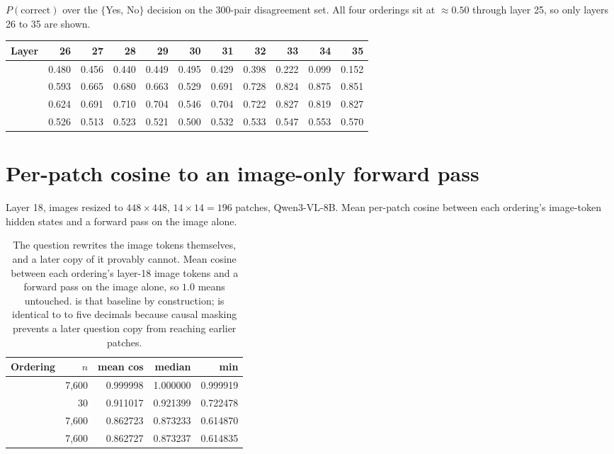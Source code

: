 $P(\text{correct})$ over the $\{$Yes, No$\}$ decision on the $300$-pair
disagreement set. All four orderings sit at $\approx 0.50$ through layer 25, so
only layers 26 to 35 are shown.

\begin{center}
\footnotesize
\setlength{\tabcolsep}{3.5pt}
\begin{tabular}{lrrrrrrrrrr}
\toprule
Layer & 26 & 27 & 28 & 29 & 30 & 31 & 32 & 33 & 34 & 35 \\
\midrule
\sti{}   & 0.480 & 0.456 & 0.440 & 0.449 & 0.495 & 0.429 & 0.398 & 0.222 & 0.099 & 0.152 \\
\sit{}   & 0.593 & 0.665 & 0.680 & 0.663 & 0.529 & 0.691 & 0.728 & 0.824 & 0.875 & 0.851 \\
\sitit{} & 0.624 & 0.691 & 0.710 & 0.704 & 0.546 & 0.704 & 0.722 & 0.827 & 0.819 & 0.827 \\
\stit{}  & 0.526 & 0.513 & 0.523 & 0.521 & 0.500 & 0.532 & 0.533 & 0.547 & 0.553 & 0.570 \\
\bottomrule
\end{tabular}
\end{center}

\section{Per-patch cosine to an image-only forward pass}
\label{app:cosine}

Layer 18, images resized to $448\times448$, $14\times14 = 196$ patches,
Qwen3-VL-8B. Mean per-patch cosine between each ordering's image-token hidden
states and a forward pass on the image alone.

\begin{table}[h]
\caption{The question rewrites the image tokens themselves, and a later copy of
it provably cannot. Mean cosine between each ordering's layer-18 image tokens
and a forward pass on the image alone, so $1.0$ means untouched. \ist{} is that
baseline by construction; \stit{} is identical to \sti{} to five decimals
because causal masking prevents a later question copy from reaching earlier
patches.}
\label{tab:cosine}
\begin{center}
\begin{tabular}{lrrrr}
\toprule
Ordering & $n$ & mean cos & median & min \\
\midrule
\ist{}  & 7{,}600 & 0.999998 & 1.000000 & 0.999919 \\
\sit{}  & 30 & 0.911017 & 0.921399 & 0.722478 \\
\sti{}  & 7{,}600 & 0.862723 & 0.873233 & 0.614870 \\
\stit{} & 7{,}600 & 0.862727 & 0.873237 & 0.614835 \\
\bottomrule
\end{tabular}
\end{center}
\end{table}

